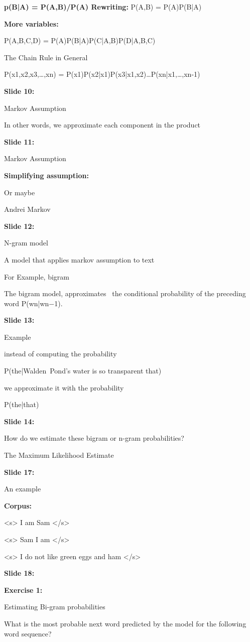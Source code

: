 \documentclass[11pt,a4paper]{article}
\begin{document}
\textbf{p(B|A) = P(A,B)/P(A)	Rewriting:}    P(A,B) = P(A)P(B|A)

\textbf{More variables:} 

P(A,B,C,D) = P(A)P(B|A)P(C|A,B)P(D|A,B,C)

The Chain Rule in General

P(x1,x2,x3,…,xn) = P(x1)P(x2|x1)P(x3|x1,x2)…P(xn|x1,…,xn-1)

\textbf{Slide 10:}

Markov Assumption

In other words, we approximate each component in the product

\textbf{Slide 11:}

Markov Assumption

\textbf{Simplifying assumption:} 

Or maybe

Andrei Markov

\textbf{Slide 12:}

N-gram model

A model that applies markov assumption to text

For Example, bigram

The bigram model, approximates  the conditional probability of the preceding word P(wn|wn−1).

\textbf{Slide 13:}

Example

instead of computing the probability

P(the|Walden Pond’s water is so transparent that)

we approximate it with the probability

P(the|that)

\textbf{Slide 14:}

How do we estimate these bigram or n-gram probabilities?

The Maximum Likelihood Estimate

\textbf{Slide 17:}

An example

\textbf{Corpus:} 

<s> I am Sam </s>

<s> Sam I am </s>

<s> I do not like green eggs and ham </s>

\textbf{Slide 18:}

\textbf{Exercise 1:} 

Estimating Bi-gram probabilities

What is the most probable next word predicted by the model for the following word sequence?
\end{document}
